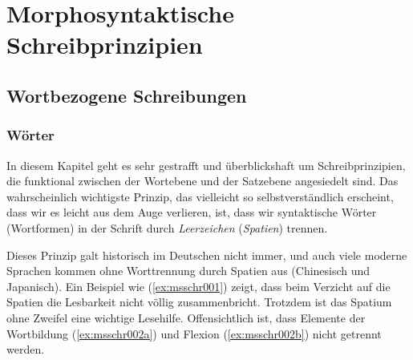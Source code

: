 \chapter{Morphosyntaktische Schreibprinzipien}

\label{sec:andereschrift}

\section{Wortbezogene Schreibungen}

\subsection{Wörter}

\label{sec:spatien}

In diesem Kapitel geht es sehr gestrafft und überblickshaft um Schreibprinzipien, die funktional zwischen der Wortebene und der Satzebene angesiedelt sind.
Das wahrscheinlich wichtigste Prinzip, das vielleicht so selbstverständlich erscheint, dass wir es leicht aus dem Auge verlieren, ist, dass wir syntaktische Wörter (Wortformen) in der Schrift durch \textit{Leerzeichen} (\textit{Spatien}) trennen.


Dieses Prinzip galt historisch im Deutschen nicht immer, und auch viele moderne Sprachen kommen ohne Worttrennung durch Spatien aus (\zB Chinesisch und Japanisch).
Ein Beispiel wie (\ref{ex:msschr001}) zeigt, dass beim Verzicht auf die Spatien die Lesbarkeit nicht völlig zusammenbricht.
Trotzdem ist das Spatium ohne Zweifel eine wichtige Lesehilfe.
Offensichtlich ist, dass Elemente der Wortbildung (\ref{ex:msschr002a}) und Flexion (\ref{ex:msschr002b}) nicht getrennt werden.

\begin{exe}
  \ex\label{ex:msschr002} 
  \begin{xlist}
  \end{xlist}
\end{exe}

